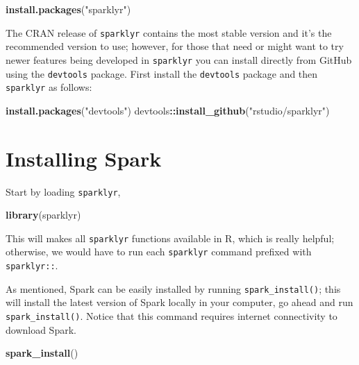 \documentclass[]{book}
\newenvironment{Shaded}{\begin{snugshade}}{\end{snugshade}}
\newcommand{\KeywordTok}[1]{\textcolor[rgb]{0.13,0.29,0.53}{\textbf{#1}}}
\newcommand{\NormalTok}[1]{#1}
\newcommand{\OperatorTok}[1]{\textcolor[rgb]{0.81,0.36,0.00}{\textbf{#1}}}
\newcommand{\StringTok}[1]{\textcolor[rgb]{0.31,0.60,0.02}{#1}}
\theoremstyle{definition}
\theoremstyle{definition}
\theoremstyle{definition}
\theoremstyle{remark}
\begin{document}
\begin{Shaded}
\begin{Highlighting}[]
\KeywordTok{install.packages}\NormalTok{(}\StringTok{"sparklyr"}\NormalTok{)}
\end{Highlighting}
\end{Shaded}

The CRAN release of \texttt{sparklyr} contains the most stable version
and it's the recommended version to use; however, for those that need or
might want to try newer features being developed in \texttt{sparklyr}
you can install directly from GitHub using the \texttt{devtools}
package. First install the \texttt{devtools} package and then
\texttt{sparklyr} as follows:

\begin{Shaded}
\begin{Highlighting}[]
\KeywordTok{install.packages}\NormalTok{(}\StringTok{"devtools"}\NormalTok{)}
\NormalTok{devtools}\OperatorTok{::}\KeywordTok{install_github}\NormalTok{(}\StringTok{"rstudio/sparklyr"}\NormalTok{)}
\end{Highlighting}
\end{Shaded}

\hypertarget{installing-spark}{%
\section{Installing Spark}\label{installing-spark}}

Start by loading \texttt{sparklyr},

\begin{Shaded}
\begin{Highlighting}[]
\KeywordTok{library}\NormalTok{(sparklyr)}
\end{Highlighting}
\end{Shaded}

This will makes all \texttt{sparklyr} functions available in R, which is
really helpful; otherwise, we would have to run each \texttt{sparklyr}
command prefixed with \texttt{sparklyr::}.

As mentioned, Spark can be easily installed by running
\texttt{spark\_install()}; this will install the latest version of Spark
locally in your computer, go ahead and run \texttt{spark\_install()}.
Notice that this command requires internet connectivity to download
Spark.

\begin{Shaded}
\begin{Highlighting}[]
\KeywordTok{spark_install}\NormalTok{()}
\end{Highlighting}
\end{Shaded}
\end{document}
